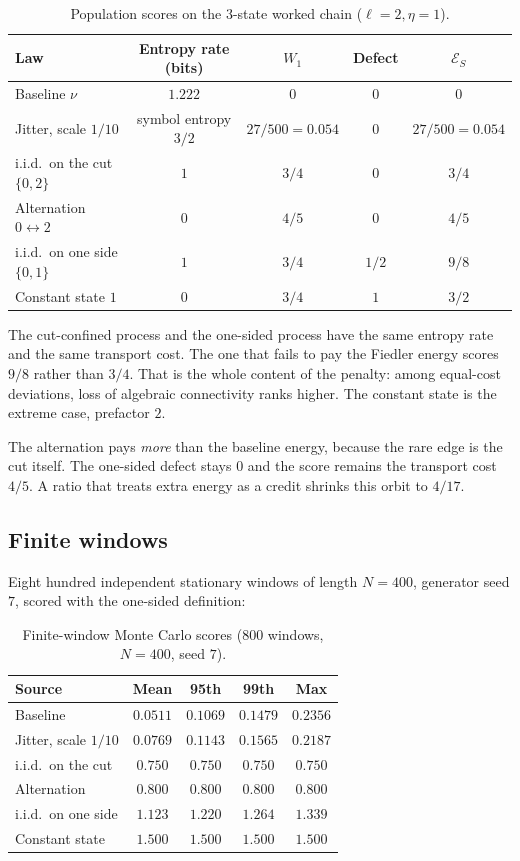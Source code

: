 \documentclass[11pt,reqno]{amsart}
\theoremstyle{remark}
\newcommand{\ES}{\mathcal{E}_S}
\begin{document}
\begin{table}[ht]
\centering
\caption{Population scores on the $3$-state worked chain ($\ell=2, \eta=1$).}\label{tab:pop}
\begin{tabular}{@{}lcccc@{}}
\toprule
Law & Entropy rate (bits) & $W_1$ & Defect & $\ES$ \\
\midrule
Baseline $\nu$ & $1.222$ & $0$ & $0$ & $0$ \\
Jitter, scale $1/10$ & symbol entropy $3/2$ & $27/500 = 0.054$ & $0$ & $27/500 = 0.054$ \\
i.i.d.\ on the cut $\{0,2\}$ & $1$ & $3/4$ & $0$ & $3/4$ \\
Alternation $0 \leftrightarrow 2$ & $0$ & $4/5$ & $0$ & $4/5$ \\
i.i.d.\ on one side $\{0,1\}$ & $1$ & $3/4$ & $1/2$ & $9/8$ \\
Constant state $1$ & $0$ & $3/4$ & $1$ & $3/2$ \\
\bottomrule
\end{tabular}
\end{table}

The cut-confined process and the one-sided process have the same entropy rate and the same transport cost. The one that fails to pay the Fiedler energy scores $9/8$ rather than $3/4$. That is the whole content of the penalty: among equal-cost deviations, loss of algebraic connectivity ranks higher. The constant state is the extreme case, prefactor $2$.

The alternation pays \emph{more} than the baseline energy, because the rare edge is the cut itself. The one-sided defect stays $0$ and the score remains the transport cost $4/5$. A ratio that treats extra energy as a credit shrinks this orbit to $4/17$.

\subsection{Finite windows}

Eight hundred independent stationary windows of length $N = 400$, generator seed $7$, scored with the one-sided definition:

\begin{table}[ht]
\centering
\caption{Finite-window Monte Carlo scores ($800$ windows, $N = 400$, seed $7$).}\label{tab:mc}
\begin{tabular}{@{}lcccc@{}}
\toprule
Source & Mean & 95th & 99th & Max \\
\midrule
Baseline & $0.0511$ & $0.1069$ & $0.1479$ & $0.2356$ \\
Jitter, scale $1/10$ & $0.0769$ & $0.1143$ & $0.1565$ & $0.2187$ \\
i.i.d.\ on the cut & $0.750$ & $0.750$ & $0.750$ & $0.750$ \\
Alternation & $0.800$ & $0.800$ & $0.800$ & $0.800$ \\
i.i.d.\ on one side & $1.123$ & $1.220$ & $1.264$ & $1.339$ \\
Constant state & $1.500$ & $1.500$ & $1.500$ & $1.500$ \\
\bottomrule
\end{tabular}
\end{table}
\end{document}
